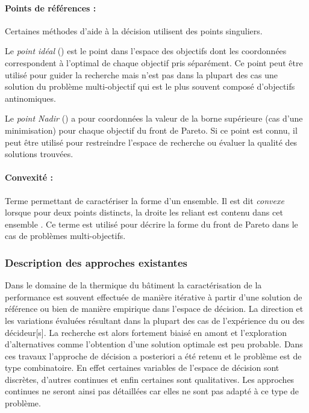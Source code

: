 \paragraph{Points de références : } %
\label{par:points_de_references}
Certaines méthodes d’aide à la décision utilisent des points singuliers.

Le \emph{point idéal} () est le point dans l’espace des objectifs dont
les coordonnées correspondent à l’optimal de chaque objectif pris séparément. Ce point
peut être utilisé pour guider la recherche mais n’est pas dans la plupart des cas
une solution du problème multi-objectif qui est le plus souvent composé d’objectifs
antinomiques.

Le \emph{point Nadir} () a pour coordonnées la
valeur de la borne supérieure (cas d’une minimisation) pour chaque objectif du front
de Pareto. Si ce point est connu, il peut être utilisé pour restreindre l’espace
de recherche ou évaluer la qualité des solutions trouvées.

\paragraph{Convexité :} %
\label{par:convexite}
Terme permettant de caractériser la forme d’un ensemble.
Il est dit \emph{convexe} lorsque pour deux points distincts, la droite les reliant
est contenu dans cet ensemble \parencite{Collette2002}. Ce terme est utilisé pour décrire
la forme du front de Pareto dans le cas de problèmes multi-objectifs.

\subsubsection{Description des approches existantes} %
\label{ssub:description_des_approches_existantes}
Dans le domaine de la thermique du bâtiment la caractérisation
de la performance est souvent effectuée de manière itérative à partir d’une solution
de référence ou bien de manière empirique dans l’espace de décision. La direction et
les variations évaluées résultant dans la plupart des cas de l’expérience du ou des
décideur[s]. La recherche est alors fortement biaisé en amont et l’exploration
d’alternatives comme l’obtention d’une solution optimale est peu probable.
Dans ces travaux l’approche de décision a posteriori a été retenu et le problème
est de type combinatoire. En effet certaines variables de l’espace de décision
sont discrètes, d’autres continues et enfin certaines sont qualitatives. Les approches
continues ne seront ainsi pas détaillées car elles ne sont pas adapté à ce type de
problème.

